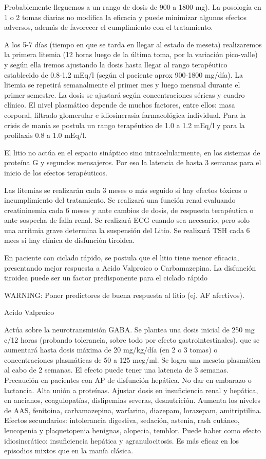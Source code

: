 Probablemente lleguemos a un rango de dosis de 900 a 1800 mg). La posología en 1 o 2 tomas diarias no modifica la eficacia y puede minimizar algunos efectos adversos, además de favorecer el cumplimiento con el tratamiento.

A los 5-7 días (tiempo en que se tarda en llegar al estado de meseta) realizaremos la primera litemia (12 horas luego de la última toma, por la variación pico-valle) y según ella iremos ajustando la dosis hasta llegar al rango terapéutico establecido de 0.8-1.2 mEq/l (según el paciente aprox 900-1800 mg/día). La litemia se repetirá semanalmente el primer mes y luego mensual durante el primer semestre. La dosis se ajustará según concentraciones séricas y cuadro clínico. El nivel plasmático depende de muchos factores, entre ellos: masa corporal, filtrado glomerular e idiosincrasia farmacológica individual. Para la crisis de manía se postula un rango terapéutico de 1.0 a 1.2 mEq/l y para la profilaxis 0.8 a 1.0 mEq/l.

El litio no actúa en el espacio sináptico sino intracelularmente, en los sistemas de proteína G y segundos mensajeros. Por eso la latencia de hasta 3 semanas para el inicio de los efectos terapéuticos.

Las litemias se realizarán cada 3 meses o más seguido si hay efectos tóxicos o incumplimiento del tratamiento. Se realizará una función renal evaluando creatininemia cada 6 meses y ante cambios de dosis, de respuesta terapéutica o ante sospecha de falla renal. Se realizará ECG cuando sea necesario, pero solo una arritmia grave determina la suspensión del Litio. Se realizará TSH cada 6 mees si hay clínica de disfunción tiroidea.

En paciente con ciclado rápido, se postula que el litio tiene menor eficacia, presentando mejor respuesta a Acido Valproico o Carbamazepina. La disfunción tiroidea puede ser un factor predisponente para el ciclado rápido


WARNING: Poner predictores de buena respuesta al litio (ej. AF afectivos).

\faPills Acido Valproico

Actúa sobre la neurotransmisión GABA. Se plantea una dosis inicial de 250 mg c/12 horas (probando tolerancia, sobre todo por efecto gastrointestinales), que se aumentará hasta dosis máxima de 20 mg/kg/día (en 2 o 3 tomas) o concentraciones plasmáticas de 50 a 125 mcg/ml. Se logra una meseta plasmática al cabo de 2 semanas. El efecto puede tener una latencia de 3 semanas. Precaución en pacientes con AP de disfunción hepática. No dar en embarazo o lactancia. Alta unión a proteínas. Ajustar dosis en insuficiencia renal y hepática, en ancianos, coagulopatías, dislipemias severas, desnutrición. Aumenta los niveles de AAS, fenitoina, carbamazepina, warfarina, diazepam, lorazepam, amitriptilina. Efectos secundarios: intolerancia digestiva, sedación, astenia, rash cutáneo, leucopenia y plaquetopenia benignas, alopecia, temblor. Puede haber como efecto idiosincrático: insuficiencia hepática y agranulocitosis.
Es más eficaz en los episodios mixtos que en la manía clásica.

